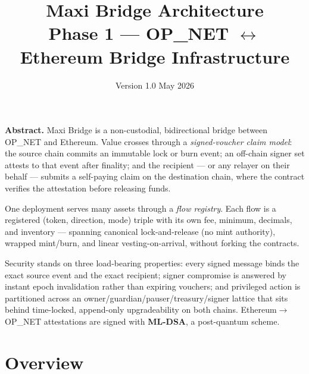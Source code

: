 \documentclass[11pt,a4paper]{article}
\title{\textbf{Maxi Bridge Architecture}\\[0.4em]
\large Phase 1 --- OP\_NET $\leftrightarrow$ Ethereum Bridge Infrastructure}
\author{}
\date{Version 1.0 \quad\textbullet\quad May 2026}
\begin{document}
\maketitle
\thispagestyle{empty}

\vspace{2em}

\begin{center}
\begin{minipage}{0.88\textwidth}
\noindent\textbf{Abstract.} Maxi Bridge is a non-custodial, bidirectional bridge between OP\_NET and Ethereum. Value crosses through a \emph{signed-voucher claim model}: the source chain commits an immutable lock or burn event; an off-chain signer set attests to that event after finality; and the recipient --- or any relayer on their behalf --- submits a self-paying claim on the destination chain, where the contract verifies the attestation before releasing funds.

\vspace{0.5em}

One deployment serves many assets through a \emph{flow registry}. Each flow is a registered (token, direction, mode) triple with its own fee, minimum, decimals, and inventory --- spanning canonical lock-and-release (no mint authority), wrapped mint/burn, and linear vesting-on-arrival, without forking the contracts.

\vspace{0.5em}

Security stands on three load-bearing properties: every signed message binds the exact source event and the exact recipient; signer compromise is answered by instant epoch invalidation rather than expiring vouchers; and privileged action is partitioned across an owner/guardian/pauser/treasury/signer lattice that sits behind time-locked, append-only upgradeability on both chains. Ethereum$\rightarrow$OP\_NET attestations are signed with \textbf{ML-DSA}, a post-quantum scheme.
\end{minipage}
\end{center}

\vspace{2em}

\renewcommand{\contentsname}{Contents}
\tableofcontents
\thispagestyle{empty}

\newpage
\setcounter{page}{1}

\section{Overview}
\end{document}
